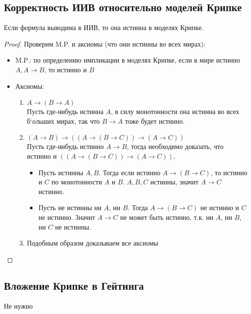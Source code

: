 \subsection{Корректность ИИВ относительно моделей Крипке}
\begin{theorem}
Если формула выводима в ИИВ, то она истинна в моделях Крипке.
\end{theorem}
\begin{proof}
Проверим M.P. и аксиомы (что они истинны во всех мирах):
\begin{itemize}
\item M.P.: по определению импликации в моделях Крипке, если в мире истинно $A, A \rightarrow B$, то истинно и $B$
\item Аксиомы:
\begin{enumerate}
\item $A \rightarrow (B \rightarrow A)$\\
Пусть где-нибудь истинна $A$, в силу монотонности она истинна во всех б`ольших мирах, так что $B \rightarrow A$ тоже будет истинно.
\item $(A \rightarrow B) \rightarrow ((A \rightarrow (B \rightarrow C)) \rightarrow (A \rightarrow C))$\\
Пусть где-нибудь истинно $A \rightarrow B$, тогда необходимо доказать, что истинно и $((A \rightarrow (B \rightarrow C)) \rightarrow (A \rightarrow C))$.
\begin{itemize}
\item Пусть истинны $A, B$. Тогда если истинно $A \rightarrow (B \rightarrow C)$, то истинно и $C$ по монотонности $A$ и $B$. $A, B, C$ истинны, значит $A \rightarrow C$ истинно.
\item Пусть не истинны ни $A$, ни $B$. Тогда $A \rightarrow (B \rightarrow C)$ не истинно и $C$ не истинно. Значит $A \rightarrow C$ не может быть истинно, т.к. ни $A$, ни $B$, ни $C$ не истинны. 
\end{itemize}
\item Подобным образом доказываем все аксиомы
\end{enumerate}
\end{itemize}
\end{proof}
\subsection{Вложение Крипке в Гейтинга}
Не нужно
